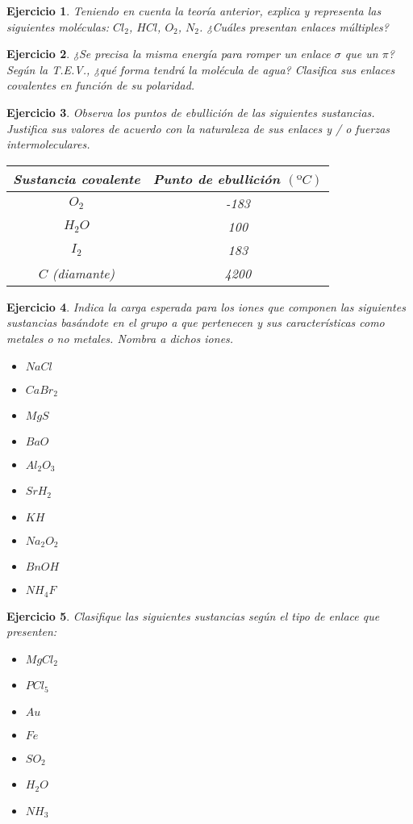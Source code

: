 \documentclass[11pt,twoside,a4paper]{article}
\theoremstyle{problem}
\newtheorem{prob}{Ejercicio}[section]
\begin{document}
\begin{prob}
Teniendo en cuenta la teoría anterior, explica y representa las siguientes moléculas:
$Cl_2$, $HCl$, $O_2$, $N_2$. ¿Cuáles presentan enlaces múltiples?
\end{prob}


\begin{prob}
¿Se precisa la misma energía para romper un enlace $\sigma$ que un $\pi$?\\
Según la T.E.V., ¿qué forma tendrá la molécula de agua? Clasifica sus enlaces covalentes
en función de su polaridad.
\end{prob}


\begin{prob}
Observa los puntos de ebullición de las siguientes sustancias. Justifica sus valores de acuerdo con
la naturaleza de sus enlaces y / o fuerzas intermoleculares.
\vspace{8pt}

\begin{tabular}{|c|c|}
\hline
Sustancia covalente& Punto de ebullición $(ºC)$\\
\hline
$O_2$&-183\\
$H_2O$&100\\
$I_2$&183\\
$C$ (diamante)&4200\\
\hline
\end{tabular}
\end{prob}


\begin{prob}
Indica la carga esperada para los iones que componen las siguientes sustancias basándote en el grupo
a que pertenecen y sus características como metales o no metales. Nombra a dichos iones.
\begin{itemize}
\item $NaCl$
\item $CaBr_2$
\item $MgS$
\item $BaO$
\item $Al_2O_3$
\item $SrH_2$
\item $KH$
\item $Na_2O_2$
\item $BnOH$
\item $NH_4F$
\end{itemize}
\end{prob}


\begin{prob}
Clasifique las siguientes sustancias según el tipo de enlace que presenten:
\begin{itemize}
\item $MgCl_2$
\item $PCl_5$
\item $Au$
\item $Fe$
\item $SO_2$
\item $H_2O$
\item $NH_3$
\end{itemize}
\end{prob}
\end{document}
